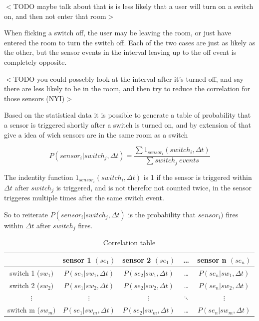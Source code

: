 $<$TODO maybe talk about that is is less likely that a user will turn on a switch on, and then not enter that room$>$

When flicking a switch off, the user may be leaving the room, or just have entered the room to turn the switch off. Each of the two cases are just as likely as the other, but the sensor events in the interval leaving up to the off event is completely opposite. 

$<$TODO you could possebly look at the interval after it's turned off, and say there are less likely to be in the room, and then try to reduce the correlation for those sensors (NYI)$>$

Based on the statistical data it is possible to generate a table of probability that a sensor is triggered shortly after a switch is turned on, and by extension of that give a idea of wich sensors are in the same room as a switch

\[ P(sensor_i | switch_j , \Delta t) = \frac{\sum 1_{sensor_i} (switch_i, \Delta t) }{\sum switch_j \ events } \]

The indentity function $ 1_{sensor_i} (switch_i, \Delta t) $ is 1 if the sensor is triggered within $\Delta t$ after $switch_j$ is triggered, and is not therefor not counted twice, in the sensor triggeres multiple times after the same switch event.

So to reiterate $ P(sensor_i | switch_j , \Delta t) $ is the probability that $sensor_i)$ fires within $\Delta t$ after $switch_j$ fires.

\begin{table}[htbp]
\begin{minipage}{\linewidth}
\setlength{\tymax}{0.5\linewidth}
\centering
\small
\caption{Correlation table}
\label{ctable}
\begin{tabulary}{\textwidth}{@{}ccccc@{}} \toprule
&sensor 1 $(se_1)$&sensor 2 $(se_1)$&{\ldots}&sensor n $(se_n)$\\
\midrule
switch 1 ($sw_1)$&$P(se_1 | sw_1, \Delta t)$&$P(se_2 | sw_1, \Delta t)$&{\ldots}&$P(se_n | sw_1, \Delta t)$\\
switch 2 ($sw_2)$&$P(se_1 | sw_2, \Delta t)$&$P(se_2 | sw_2, \Delta t)$&{\ldots}&$P(se_n | sw_2, \Delta t)$\\
$\vdots$&$\vdots$&$\vdots$&$\ddots$&$\vdots$\\
switch m ($sw_m)$&$P(se_1 | sw_m, \Delta t)$&$P(se_2 | sw_m, \Delta t)$&{\ldots}&$P(se_n | sw_m, \Delta t)$\\

\bottomrule

\end{tabulary}
\end{minipage}
\end{table}

